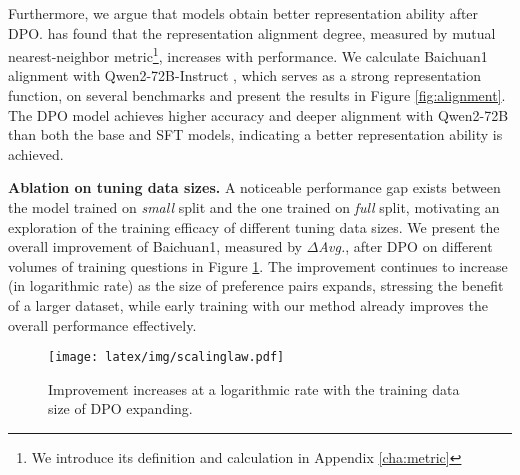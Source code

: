 Furthermore, we argue that models obtain better representation ability after DPO. \citet{huh2024platonic} has found that the representation alignment degree, measured by mutual nearest-neighbor metric\footnote{We introduce its definition and calculation in Appendix \ref{cha:metric}}, increases with performance. We calculate Baichuan1 alignment with Qwen2-72B-Instruct \citep{qwen2}, which serves as a strong representation function, on several benchmarks and present the results in Figure \ref{fig:alignment}. The DPO model achieves higher accuracy and deeper alignment with Qwen2-72B than both the base and SFT models, indicating a better representation ability is achieved.

\textbf{Ablation on tuning data sizes.} A noticeable performance gap exists between the model trained on \textit{small} split and the one trained on \textit{full} split, motivating an exploration of the training efficacy of different tuning data sizes. We present the overall improvement of Baichuan1, measured by \textit{$\Delta$Avg.}, after DPO on different volumes of training questions in Figure \ref{fig:scalinglaw}. The improvement continues to increase (in logarithmic rate) as the size of preference pairs expands, stressing the benefit of a larger dataset, while early training with our method already improves the overall performance effectively.

\begin{figure}[!t]
  \texttt{[image: latex/img/scalinglaw.pdf]}
  \caption{Improvement increases at a logarithmic rate with the training data size of DPO expanding.}
  \label{fig:scalinglaw}
\end{figure}
